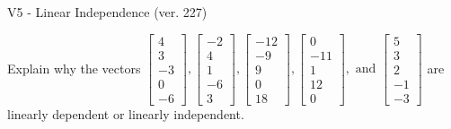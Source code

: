 \begin{exercise}
  \begin{exerciseTitle}V5 - Linear Independence (ver. 227)\end{exerciseTitle}
  \begin{exerciseStatement}
    Explain why the vectors \(\left[\begin{array}{r}
4 \\
3 \\
-3 \\
0 \\
-6
\end{array}\right] , \left[\begin{array}{r}
-2 \\
4 \\
1 \\
-6 \\
3
\end{array}\right] , \left[\begin{array}{r}
-12 \\
-9 \\
9 \\
0 \\
18
\end{array}\right] , \left[\begin{array}{r}
0 \\
-11 \\
1 \\
12 \\
0
\end{array}\right] , \text{ and } \left[\begin{array}{r}
5 \\
3 \\
2 \\
-1 \\
-3
\end{array}\right]\) are linearly dependent or linearly independent.	



\end{exerciseStatement}
\end{exercise}
